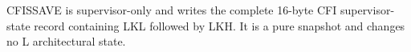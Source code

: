 CFISSAVE is supervisor-only and writes the complete 16-byte CFI supervisor-state record containing LKL followed by LKH. It is a pure snapshot and changes no L architectural state.
